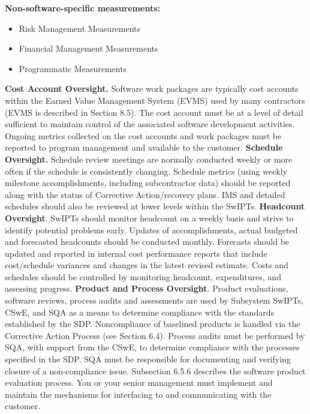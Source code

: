 \documentclass{book}
\begin{document}
\begin{multicols}{2}
		\textbf{Non-software-specific measurements:}
			\begin{itemize}
		\item Risk Management Measurements
    	\item Financial Management Measurements
		\item Programmatic Measurements %
			\end{itemize}
		\textbf{Cost Account Oversight.} Software work packages are
		typically cost accounts within the Earned Value Management
		System (EVMS) used by many contractors (EVMS is
		described in Section 8.5). The cost account must be at a level
		of detail sufficient to maintain control of the associated software development activities. Ongoing metrics collected on
		the cost accounts and work packages must be reported to
		program management and available to the customer.
		\textbf{Schedule Oversight.} Schedule review meetings are normally conducted weekly or more often if the schedule is consistently changing. Schedule metrics (using weekly milestone
		accomplishments, including subcontractor data) should be
		reported along with the status of Corrective Action/recovery
		plans. IMS and detailed schedules should also be reviewed at
		lower levels within the SwIPTs.
		\textbf{Headcount Oversight}. SwIPTs should monitor headcount on a weekly basis and strive to identify potential problems early. Updates of accomplishments, actual budgeted
		and forecasted headcounts should be conducted monthly.
		Forecasts should be updated and reported in internal cost
		performance reports that include cost/schedule variances
		and changes in the latest revised estimate. Costs and schedules should be controlled by monitoring headcount, expenditures, and assessing progress.
		\textbf{Product and Process Oversight}. Product evaluations,
		software reviews, process audits and assessments are used by
		Subsystem SwIPTs, CSwE, and SQA as a means to determine
		compliance with the standards established by the SDP. Noncompliance of baselined products is handled via the Corrective
		Action Process (see Section 6.4). Process audits must be performed by SQA, with support from the CSwE, to determine
		compliance with the processes specified in the SDP. SQA
		must be responsible for documenting and verifying closure
		of a non-compliance issue. Subsection 6.5.6 describes the
		software product evaluation process. You or your senior management must implement and maintain the mechanisms for
		interfacing to and communicating with the customer.
	\end{multicols}
\end{document}
